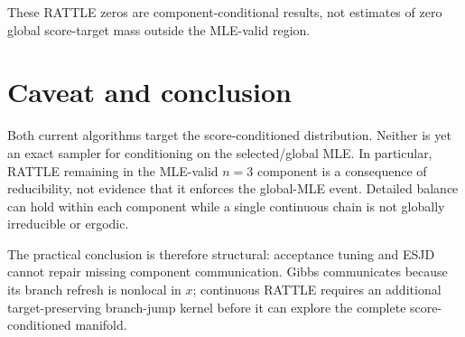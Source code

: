\documentclass[11pt]{article}
\begin{document}
These RATTLE zeros are component-conditional results, not estimates of zero
global score-target mass outside the MLE-valid region.

\section{Caveat and conclusion}

Both current algorithms target the score-conditioned distribution.  Neither is
yet an exact sampler for conditioning on the selected/global MLE.  In
particular, RATTLE remaining in the MLE-valid $n=3$ component is a consequence
of reducibility, not evidence that it enforces the global-MLE event.  Detailed
balance can hold within each component while a single continuous chain is not
globally irreducible or ergodic.

The practical conclusion is therefore structural: acceptance tuning and ESJD
cannot repair missing component communication.  Gibbs communicates because its
branch refresh is nonlocal in $x$; continuous RATTLE requires an additional
target-preserving branch-jump kernel before it can explore the complete
score-conditioned manifold.

\end{document}
